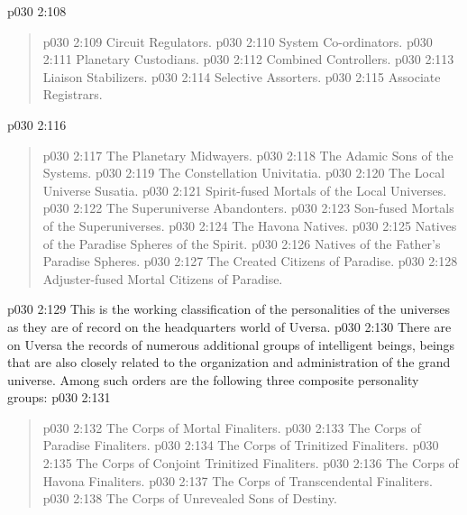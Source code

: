 \vsetspace
\vs p030 2:108 \bibnobreakspace {}
\begin{quote}
\vs p030 2:109 \bibnobreakspace Circuit Regulators.
\vs p030 2:110 \bibnobreakspace System Co\hyp{}ordinators.
\vs p030 2:111 \bibnobreakspace Planetary Custodians.
\vs p030 2:112 \bibnobreakspace Combined Controllers.
\vs p030 2:113 \bibnobreakspace Liaison Stabilizers.
\vs p030 2:114 \bibnobreakspace Selective Assorters.
\vs p030 2:115 \bibnobreakspace Associate Registrars.
\end{quote}
\vsetspace
\vs p030 2:116 \kern4pt\bibnobreakspace {}
\begin{quote}
\vs p030 2:117 \bibnobreakspace The Planetary Midwayers.
\vs p030 2:118 \bibnobreakspace The Adamic Sons of the Systems.
\vs p030 2:119 \bibnobreakspace The Constellation Univitatia.
\vs p030 2:120 \bibnobreakspace The Local Universe Susatia.
\vs p030 2:121 \bibnobreakspace Spirit\hyp{}fused Mortals of the Local Universes.
\vs p030 2:122 \bibnobreakspace The Superuniverse Abandonters.
\vs p030 2:123 \bibnobreakspace Son\hyp{}fused Mortals of the Superuniverses.
\vs p030 2:124 \bibnobreakspace The Havona Natives.
\vs p030 2:125 \bibnobreakspace Natives of the Paradise Spheres of the Spirit.
\vs p030 2:126 \bibnobreakspace Natives of the Father’s Paradise Spheres.
\vs p030 2:127 \bibnobreakspace The Created Citizens of Paradise.
\vs p030 2:128 \bibnobreakspace Adjuster\hyp{}fused Mortal Citizens of Paradise.
\end{quote}
\vs p030 2:129 \pc This is the working classification of the personalities of the universes as they are of record on the headquarters world of Uversa.
\vsetspace
\vs p030 2:130 \pc {} There are on Uversa the records of numerous additional groups of intelligent beings, beings that are also closely related to the organization and administration of the grand universe. Among such orders are the following three composite personality groups:
\vsetspace
\vs p030 2:131 \bibnobreakspace {}
\begin{quote}
\vs p030 2:132 \bibnobreakspace The Corps of Mortal Finaliters.
\vs p030 2:133 \bibnobreakspace The Corps of Paradise Finaliters.
\vs p030 2:134 \bibnobreakspace The Corps of Trinitized Finaliters.
\vs p030 2:135 \bibnobreakspace The Corps of Conjoint Trinitized Finaliters.
\vs p030 2:136 \bibnobreakspace The Corps of Havona Finaliters.
\vs p030 2:137 \bibnobreakspace The Corps of Transcendental Finaliters.
\vs p030 2:138 \bibnobreakspace The Corps of Unrevealed Sons of Destiny.
\end{quote}

